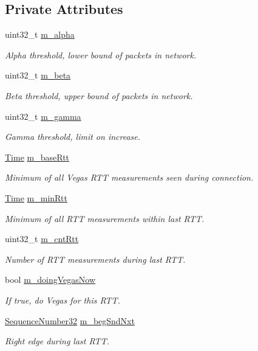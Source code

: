\subsection*{Private Attributes}
\begin{DoxyCompactItemize}
\item 
uint32\+\_\+t \hyperlink{classns3_1_1TcpVegas_a50cf33c05a6dd0e6a8da11e741291de8}{m\+\_\+alpha}
\begin{DoxyCompactList}\small\item\em Alpha threshold, lower bound of packets in network. \end{DoxyCompactList}\item 
uint32\+\_\+t \hyperlink{classns3_1_1TcpVegas_a5871bf3ef55a392819a26c80f8c0a87f}{m\+\_\+beta}
\begin{DoxyCompactList}\small\item\em Beta threshold, upper bound of packets in network. \end{DoxyCompactList}\item 
uint32\+\_\+t \hyperlink{classns3_1_1TcpVegas_ae3ea97171ce6954d2b607f6bc8b9239c}{m\+\_\+gamma}
\begin{DoxyCompactList}\small\item\em Gamma threshold, limit on increase. \end{DoxyCompactList}\item 
\hyperlink{classns3_1_1Time}{Time} \hyperlink{classns3_1_1TcpVegas_ae283bcc32d2d92002477abafd1ca5132}{m\+\_\+base\+Rtt}
\begin{DoxyCompactList}\small\item\em Minimum of all Vegas R\+TT measurements seen during connection. \end{DoxyCompactList}\item 
\hyperlink{classns3_1_1Time}{Time} \hyperlink{classns3_1_1TcpVegas_aba6a10d787820b6907313b79cc16582c}{m\+\_\+min\+Rtt}
\begin{DoxyCompactList}\small\item\em Minimum of all R\+TT measurements within last R\+TT. \end{DoxyCompactList}\item 
uint32\+\_\+t \hyperlink{classns3_1_1TcpVegas_a4149c239657ba2ea7399374ec0fd9682}{m\+\_\+cnt\+Rtt}
\begin{DoxyCompactList}\small\item\em Number of R\+TT measurements during last R\+TT. \end{DoxyCompactList}\item 
bool \hyperlink{classns3_1_1TcpVegas_a8207740cdef670e55f31d067baf10c06}{m\+\_\+doing\+Vegas\+Now}
\begin{DoxyCompactList}\small\item\em If true, do Vegas for this R\+TT. \end{DoxyCompactList}\item 
\hyperlink{group__network_gacb2070e4e98d2d5135c9bede58f07a03}{Sequence\+Number32} \hyperlink{classns3_1_1TcpVegas_affe4c208f73217f8f29380b91d287ed8}{m\+\_\+beg\+Snd\+Nxt}
\begin{DoxyCompactList}\small\item\em Right edge during last R\+TT. \end{DoxyCompactList}\end{DoxyCompactItemize}
